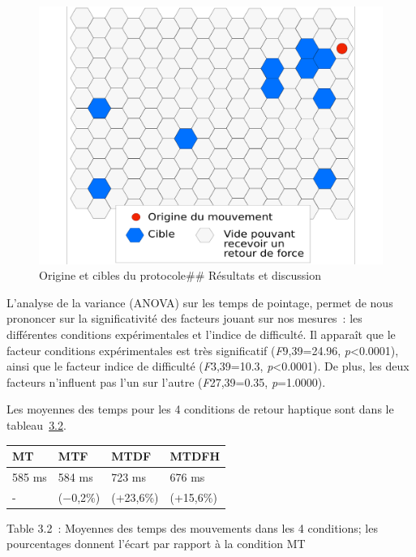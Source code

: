 \documentclass[
]{book}
\begin{document}
\begin{figure}
\centering
\includegraphics{img/damier.svg}
\caption{\label{fig:protocole}Origine et cibles du protocole\#\# Résultats et discussion}
\end{figure}

L'analyse de la variance (ANOVA) sur les temps de pointage, permet de nous
prononcer sur la significativité des facteurs jouant sur nos mesures~: les
différentes conditions expérimentales et l'indice de difficulté. Il apparaît
que le facteur conditions expérimentales est très significatif
(\emph{F}9,39=24.96, \emph{p}\textless0.0001), ainsi que le facteur indice de difficulté
(\emph{F}3,39=10.3, \emph{p}\textless0.0001). De plus, les deux facteurs n'influent pas l'un
sur l'autre (\emph{F}27,39=0.35, \emph{p}=1.0000).

Les moyennes des temps pour les 4 conditions de retour haptique sont dans
le tableau~\protect\hyperlink{table3}{3.2}.

\begin{longtable}[]{@{}llll@{}}
\toprule()
MT & MTF & MTDF & MTDFH \\
\midrule()
\endhead
585 ms & 584 ms & 723 ms & 676 ms \\
- & (−0,2\%) & (+23,6\%) & (+15,6\%) \\
\bottomrule()
\end{longtable}

Table 3.2~: Moyennes des temps des
mouvements dans les 4 conditions; les pourcentages donnent l'écart
par rapport à la condition MT
\end{document}
